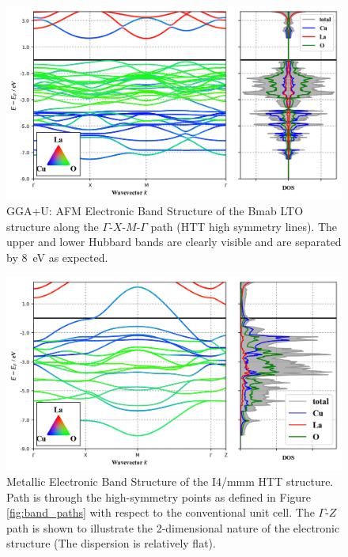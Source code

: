 \begin{figure}
   \centering
   \includegraphics[width=\textwidth]{fig/simulation/bs_afm1.png}
   \caption[GGA+U: AFM Electronic Band Structure]{GGA+U: AFM Electronic Band Structure of the Bmab LTO structure along the $\Gamma$-$X$-$M$-$\Gamma$ path (HTT high symmetry lines). The upper and lower Hubbard bands are clearly visible and are separated by \SI{8}{\eV} as expected.}
   \label{fig:bs_afm1}
\end{figure}

\begin{figure}
    \centering
    \includegraphics[width=\textwidth]{fig/simulation/bs_metal.png}
    \caption[GGA: Metallic Electronic Band Structure]{Metallic Electronic Band Structure of the I4/mmm HTT structure. Path is through the high-symmetry points as defined in Figure \ref{fig:band_paths} with respect to the conventional unit cell. The $\Gamma$-$Z$ path is shown to illustrate the 2-dimensional nature of the electronic structure (The dispersion is relatively flat).}
    \label{fig:bs_metal}
\end{figure}


